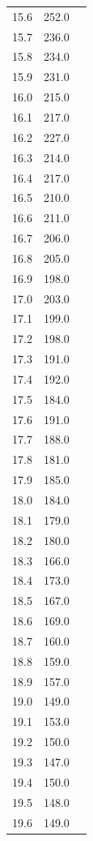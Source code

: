 \begin{minipage}{\linewidth}
\begin{table}[H]
\begin{tabular}{lll}
        15.6	& 252.0 \\
        15.7	& 236.0 \\
        15.8	& 234.0 \\
        15.9	& 231.0 \\
        16.0	& 215.0 \\
        16.1	& 217.0 \\
        16.2	& 227.0 \\
        16.3	& 214.0 \\
        16.4	& 217.0 \\
        16.5	& 210.0 \\
        16.6	& 211.0 \\
        16.7	& 206.0 \\
        16.8	& 205.0 \\
        16.9	& 198.0 \\
        17.0	& 203.0 \\
        17.1	& 199.0 \\
        17.2	& 198.0 \\
        17.3	& 191.0 \\
        17.4	& 192.0 \\
        17.5	& 184.0 \\
        17.6	& 191.0 \\
        17.7	& 188.0 \\
        17.8	& 181.0 \\
        17.9	& 185.0 \\
        18.0	& 184.0 \\
        18.1	& 179.0 \\
        18.2	& 180.0 \\
        18.3	& 166.0 \\
        18.4	& 173.0 \\
        18.5	& 167.0 \\
        18.6	& 169.0 \\
        18.7	& 160.0 \\
        18.8	& 159.0 \\
        18.9	& 157.0 \\
        19.0	& 149.0 \\
        19.1	& 153.0 \\
        19.2	& 150.0 \\
        19.3	& 147.0 \\
        19.4	& 150.0 \\
        19.5	& 148.0 \\
        19.6	& 149.0 \\

\end{tabular}
\end{table}
\end{minipage}
